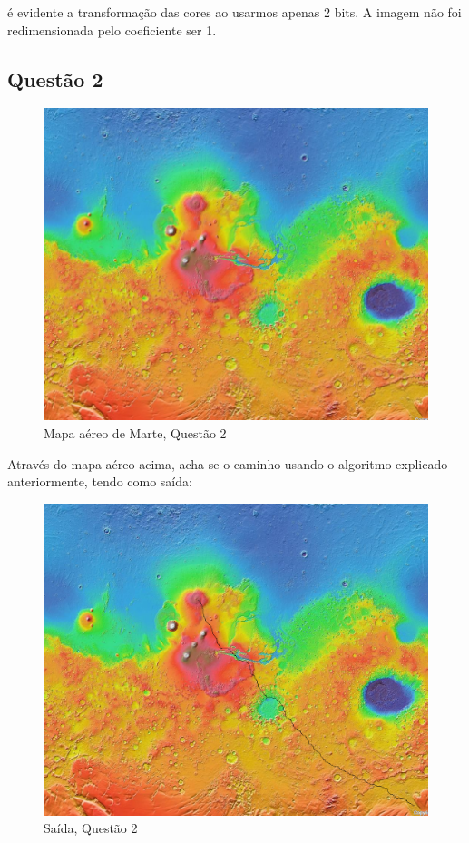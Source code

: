 \documentclass[conference]{IEEEtran}
\begin{document}
é evidente a transformação das cores ao usarmos apenas 2 bits. A imagem não
foi redimensionada pelo coeficiente ser 1.

\subsection{Questão 2}

\begin{figure}[h]
    \centering
    \includegraphics[scale=0.6]{Figs/mars.png}
    \caption{Mapa aéreo de Marte, Questão 2}
    \label{fig2}
\end{figure}

Através do mapa aéreo acima, acha-se o caminho usando o algoritmo explicado
anteriormente, tendo como saída:

\begin{figure}[h]
    \centering
    \includegraphics[scale=0.25]{Figs/path.png}
    \caption{Saída, Questão 2}
    \label{fig2}
\end{figure}
\end{document}

